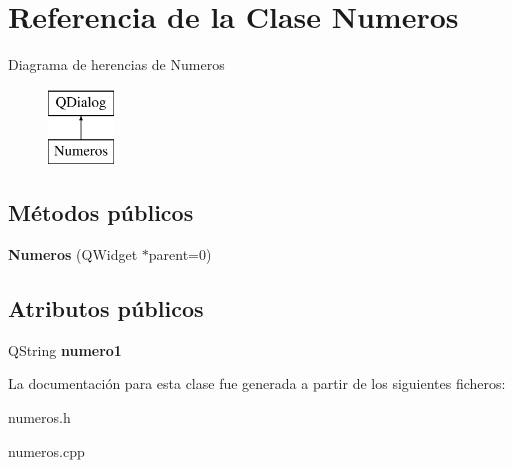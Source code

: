 \hypertarget{class_numeros}{\section{Referencia de la Clase Numeros}
\label{class_numeros}
}
Diagrama de herencias de Numeros\begin{figure}[H]
\begin{center}
\leavevmode
\includegraphics[height=2.000000cm]{class_numeros}
\end{center}
\end{figure}
\subsection*{Métodos públicos}
\begin{DoxyCompactItemize}
\item 
\hypertarget{class_numeros_a6b275591800c3405ed7552b0b03a9077}{{\bfseries Numeros} (Q\-Widget $\ast$parent=0)}\label{class_numeros_a6b275591800c3405ed7552b0b03a9077}

\end{DoxyCompactItemize}
\subsection*{Atributos públicos}
\begin{DoxyCompactItemize}
\item 
\hypertarget{class_numeros_a36867690204e7b9b52bc80249ca5c0bf}{Q\-String {\bfseries numero1}}\label{class_numeros_a36867690204e7b9b52bc80249ca5c0bf}

\end{DoxyCompactItemize}


La documentación para esta clase fue generada a partir de los siguientes ficheros\-:\begin{DoxyCompactItemize}
\item 
numeros.\-h\item 
numeros.\-cpp\end{DoxyCompactItemize}
